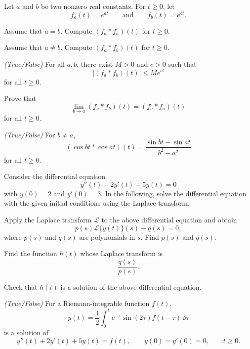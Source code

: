 \begin{problem}
Let $a$ and $b$ be two nonzero real constants. For $t\ge0$, let
\[
f_a(t)=e^{at}
\qquad\text{and}\qquad
f_b(t)=e^{bt}.
\]
\begin{problemsubparts}
\item Assume that $a=b$. Compute $(f_a\ast f_a)(t)$ for $t\ge0$.
\item Assume that $a\ne b$. Compute $(f_a\ast f_b)(t)$ for $t\ge0$.
\item \textit{(True/False)} For all $a,b$, there exist $M>0$ and $c>0$ such that
\[
\bigl|(f_a\ast f_b)(t)\bigr|\le Me^{ct}
\]
for all $t\ge0$.
\item Prove that
\[
\lim_{b\to a}(f_a\ast f_b)(t)=(f_a\ast f_a)(t)
\]
for all $t\ge0$.
\item \textit{(True/False)} For $b\ne a$,
\[
(\cos bt\ast\cos at)(t)=\frac{\sin bt-\sin at}{b^2-a^2}
\]
for all $t\ge0$.
\end{problemsubparts}
\end{problem}

\begin{problem}
Consider the differential equation
\[
y''(t)+2y'(t)+5y(t)=0
\]
with $y(0)=2$ and $y'(0)=3$. In the following, solve the differential equation with the given initial conditions using the Laplace transform.
\begin{problemsubparts}
\item Apply the Laplace transform $\mathcal{L}$ to the above differential equation and obtain
\[
p(s)\mathcal{L}\{y(t)\}(s)-q(s)=0,
\]
where $p(s)$ and $q(s)$ are polynomials in $s$. Find $p(s)$ and $q(s)$.
\item Find the function $h(t)$ whose Laplace transform is
\[
\frac{q(s)}{p(s)}.
\]
\item Check that $h(t)$ is a solution of the above differential equation.
\item \textit{(True/False)} For a Riemann-integrable function $f(t)$,
\[
y(t)=\frac12\int_0^t e^{-\tau}\sin(2\tau)f(t-\tau)\,\dd\tau
\]
is a solution of
\[
y''(t)+2y'(t)+5y(t)=f(t),
\qquad
y(0)=y'(0)=0,
\qquad t\ge0.
\]
\end{problemsubparts}
\end{problem}


